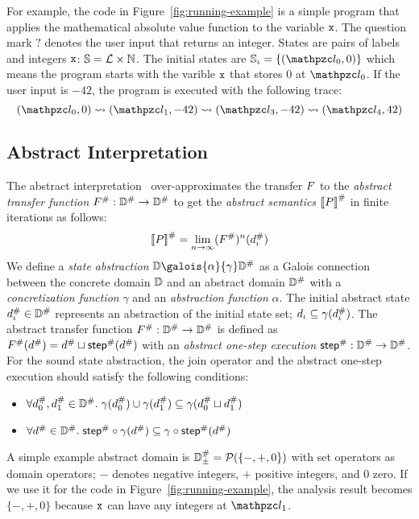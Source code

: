 For example, the code in Figure~\ref{fig:running-example} is a simple program
that applies the mathematical absolute value function to the variable $\texttt{x}$.
The question mark $?$ denotes the user input that returns an integer.  States
are pairs of labels and integers $\texttt{x}$: $\mathbb{S} = \mathcal{L} \times \mathbb{N}$.
The initial states are $\istset = \{ (\lab_0, 0) \}$ which means the program
starts with the varible $\texttt{x}$ that stores 0 at $\lab_0$.  If the user input is
$-42$, the program is executed with the following trace:
\[
  (\lab_0, 0) \trans (\lab_1, -42) \trans (\lab_3, -42) \trans (\lab_4, 42)
\]

\subsection{Abstract Interpretation}
The abstract interpretation~\cite{abs-interp-1977, abs-interp-1992}
over-approximates the transfer $F$ to the \textit{abstract transfer
function} ${F}^{\#}: {\mathbb{D}}^{\#} \rightarrow {\mathbb{D}}^{\#}$ to get the
\textit{abstract semantics} ${[\![{P}]\!]}^{\#}$ in finite iterations as follows:
\[
    {[\![{P}]\!]}^{\#} = \underset{n \rightarrow
    \infty}{\lim}{({F}^{\#})^n({d}^{\#}_\iota)}\\
\]
We define a \textit{state abstraction} $\dom \galois{\alpha}{\gamma} \absdom$ as
a Galois connection between the concrete domain $\mathbb{D}$ and an abstract domain
${\mathbb{D}}^{\#}$ with a \textit{concretization function} $\gamma$ and an
\textit{abstraction function} $\alpha$.  The initial abstract state ${d}^{\#}_\iota
\in {\mathbb{D}}^{\#}$ represents an abstraction of the initial state set; $d_\iota
\subseteq \gamma({d}^{\#}_\iota)$.  The abstract transfer function ${F}^{\#}:
{\mathbb{D}}^{\#} \rightarrow {\mathbb{D}}^{\#}$ is defined as ${F}^{\#}({d}^{\#}) = {d}^{\#}
\sqcup {\textsf{step}}^{\#}({d}^{\#})$ with an \textit{abstract one-step execution}
${\textsf{step}}^{\#}: {\mathbb{D}}^{\#} \rightarrow {\mathbb{D}}^{\#}$.  For the sound state abstraction, the
join operator and the abstract one-step execution should satisfy the following
conditions:
\begin{itemize}
  \item $\forall {d}^{\#}_0, {d}^{\#}_1 \in {\mathbb{D}}^{\#}. \; \gamma({d}^{\#}_0) \cup
    \gamma({d}^{\#}_1) \subseteq \gamma({d}^{\#}_0 \sqcup {d}^{\#}_1)$
  \item $\forall {d}^{\#} \in {\mathbb{D}}^{\#}. \; {\textsf{step}}^{\#} \circ \gamma({d}^{\#}) \subseteq
    \gamma \circ {\textsf{step}}^{\#}({d}^{\#})$
\end{itemize}

A simple example abstract domain is ${\mathbb{D}}^{\#}_\pm = \mathcal{P}(\{ -, +, 0 \})$ with
set operators as domain operators; $-$ denotes negative integers, $+$ positive
integers, and $0$ zero.  If we use it for the code in
Figure~\ref{fig:running-example}, the analysis result becomes $\{ -, +, 0 \}$
because $\texttt{x}$ can have any integers at $\lab_1$.


